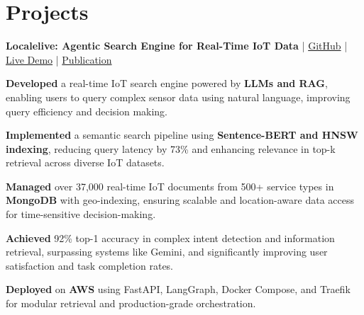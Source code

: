         


    \vspace{-0.2cm}
    \section{Projects}


\begin{onecolentry}
\textbf{Localelive: Agentic Search Engine for Real-Time IoT Data} | \href{https://github.com/SensorsConnect/IoT-Agentic-Search-Engine}{GitHub} | \href{https://localelive.space/}{Live Demo} | \href{https://www.mdpi.com/1424-8220/25/19/5995}{Publication}
\begin{highlights}
    \item \textbf{Developed} a real-time IoT search engine powered by \textbf{LLMs and RAG}, enabling users to query complex sensor data using natural language, improving query efficiency and decision making. %
    
    \item \textbf{Implemented} a semantic search pipeline using \textbf{Sentence-BERT and HNSW indexing}, reducing query latency by 73\% and enhancing relevance in top-k retrieval across diverse IoT datasets.
    
    \item \textbf{Managed} over 37,000 real-time IoT documents from 500+ service types in \textbf{MongoDB} with geo-indexing, ensuring scalable and location-aware data access for time-sensitive decision-making.
    
    \item \textbf{Achieved} 92\% top-1 accuracy in complex intent detection and information retrieval, surpassing systems like Gemini, and significantly improving user satisfaction and task completion rates. %
        
    \item \textbf{Deployed} on \textbf{AWS} using FastAPI, LangGraph, Docker Compose, and Traefik for modular retrieval and production-grade orchestration.

    
\end{highlights}
\end{onecolentry}




